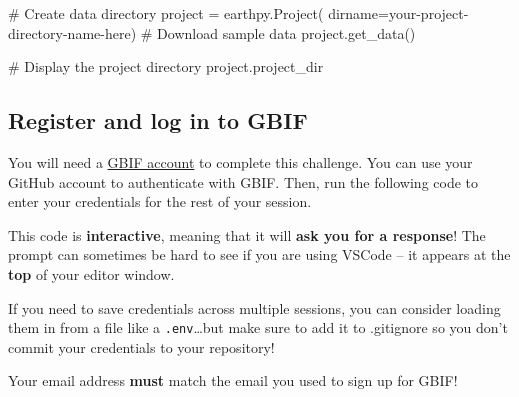 \documentclass[
]{report}
\newenvironment{Shaded}{\begin{snugshade}}{\end{snugshade}}
\newcommand{\CommentTok}[1]{\textcolor[rgb]{0.37,0.37,0.37}{#1}}
\newcommand{\NormalTok}[1]{\textcolor[rgb]{0.00,0.23,0.31}{#1}}
\newcommand{\OperatorTok}[1]{\textcolor[rgb]{0.37,0.37,0.37}{#1}}
\newcommand{\StringTok}[1]{\textcolor[rgb]{0.13,0.47,0.30}{#1}}
\begin{document}
\begin{Shaded}
\begin{Highlighting}[]
\CommentTok{\# Create data directory}
\NormalTok{project }\OperatorTok{=}\NormalTok{ earthpy.Project(}
\NormalTok{    dirname}\OperatorTok{=}\StringTok{\textquotesingle{}your{-}project{-}directory{-}name{-}here\textquotesingle{}}\NormalTok{)}
\CommentTok{\# Download sample data}
\NormalTok{project.get\_data()}

\CommentTok{\# Display the project directory}
\NormalTok{project.project\_dir}
\end{Highlighting}
\end{Shaded}

\subsection{Register and log in to
GBIF}\label{register-and-log-in-to-gbif}

You will need a \href{https://www.gbif.org/}{GBIF account} to complete
this challenge. You can use your GitHub account to authenticate with
GBIF. Then, run the following code to enter your credentials for the
rest of your session.

This code is \textbf{interactive}, meaning that it will \textbf{ask you
for a response}! The prompt can sometimes be hard to see if you are
using VSCode -- it appears at the \textbf{top} of your editor window.

\begin{tcolorbox}[enhanced jigsaw, breakable, colframe=quarto-callout-tip-color-frame, toptitle=1mm, bottomrule=.15mm, colbacktitle=quarto-callout-tip-color!10!white, opacityback=0, opacitybacktitle=0.6, coltitle=black, title=\textcolor{quarto-callout-tip-color}{\faLightbulb}\hspace{0.5em}{Tip}, left=2mm, bottomtitle=1mm, titlerule=0mm, arc=.35mm, colback=white, rightrule=.15mm, toprule=.15mm, leftrule=.75mm]

If you need to save credentials across multiple sessions, you can
consider loading them in from a file like a \texttt{.env}\ldots but make
sure to add it to .gitignore so you don't commit your credentials to
your repository!

\end{tcolorbox}

\begin{tcolorbox}[enhanced jigsaw, breakable, colframe=quarto-callout-warning-color-frame, toptitle=1mm, bottomrule=.15mm, colbacktitle=quarto-callout-warning-color!10!white, opacityback=0, opacitybacktitle=0.6, coltitle=black, title=\textcolor{quarto-callout-warning-color}{\faExclamationTriangle}\hspace{0.5em}{Warning}, left=2mm, bottomtitle=1mm, titlerule=0mm, arc=.35mm, colback=white, rightrule=.15mm, toprule=.15mm, leftrule=.75mm]

Your email address \textbf{must} match the email you used to sign up for
GBIF!

\end{tcolorbox}
\end{document}
